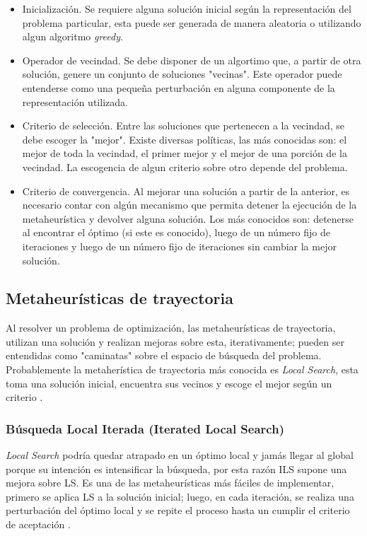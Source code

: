 \documentclass{ci5652}
\begin{document}
\begin{itemize}
  \item Inicialización. Se requiere alguna solución inicial según la representación del problema particular, esta puede ser generada de manera aleatoria o utilizando algun algoritmo \textit{greedy}.
  \item Operador de vecindad. Se debe disponer de un algortimo que, a partir de otra solución, genere un conjunto de soluciones "vecinas". Este operador puede entenderse como una pequeña perturbación en alguna componente de la representación utilizada.
  \item Criterio de selección. Entre las soluciones que pertenecen a la vecindad, se debe escoger la "mejor". Existe diversas políticas, las más conocidas son: el mejor de toda la vecindad, el primer mejor y el mejor de una porción de la vecindad. La escogencia de algun criterio sobre otro depende del problema.
  \item Criterio de convergencia. Al mejorar una solución a partir de la anterior, es necesario contar con algún mecanismo que permita detener la ejecución de la metaheurística y devolver alguna solución. Los más conocidos son: detenerse al encontrar el óptimo (si este es conocido), luego de un número fijo de iteraciones y luego de un número fijo de iteraciones sin cambiar la mejor solución.
\end{itemize}

\subsection{Metaheurísticas de trayectoria}

Al resolver un problema de optimización, las metaheurísticas de trayectoria, utilizan una solución y realizan mejoras sobre esta, iterativamente; pueden ser entendidas como "caminatas" sobre el espacio de búsqueda del problema. Probablemente la metaherística de trayectoria más conocida es \textit{Local Search}, esta toma una solución inicial, encuentra sus vecinos y escoge el mejor según un criterio \cite{Talbi_2009}. 

\subsubsection{Búsqueda Local Iterada (Iterated Local Search)}

\textit{Local Search} podría quedar atrapado en un óptimo local y jamás llegar al global porque su intención es intensificar la búsqueda, por esta razón ILS supone una mejora sobre LS. Es una de las metaheurísticas más fáciles de implementar,
primero se aplica LS a la solución inicial; luego, en cada iteración, se realiza una perturbación del óptimo local y se repite el proceso hasta un cumplir el criterio de aceptación \cite{Talbi_2009}.
\end{document}
